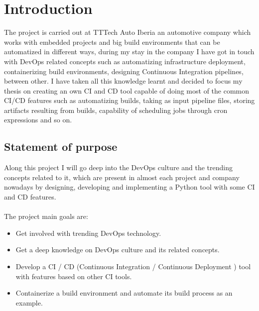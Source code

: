 \documentclass{article}
\begin{document}
\tableofcontents
\newpage

\listoffigures

\newpage
{}
\listoftables

\newpage
\section{Introduction}

The project is carried out at TTTech Auto Iberia an automotive company which works with embedded projects and big build environments that can be automatized in different ways, during my stay in the company I have got in touch with DevOps related concepts such as automatizing infrastructure deployment, containerizing build environments, designing Continuous Integration pipelines, between other. I have taken all this knowledge learnt and decided to focus my thesis on creating an own \gls{CI} and \gls{CD} tool capable of doing most of the common \gls{CI}/\gls{CD} features such as automatizing builds, taking as input pipeline files, storing artifacts resulting from builds, capability of scheduling jobs through cron expressions and so on.

\subsection{Statement of purpose}

Along this project I will go deep into the DevOps culture and the trending concepts related to it, which are present in almost each project and company nowadays by designing, developing and implementing a Python tool with some \gls{CI} and \gls{CD} features.
\\~\\
The project main goals are:
\begin{itemize}
	\item Get involved with trending DevOps technology.
	\item Get a deep knowledge on DevOps culture and its related concepts.
	\item Develop a \gls{CI} / \gls{CD} (Continuous Integration / Continuous Deployment ) tool with features based on other \gls{CI} tools.
	\item Containerize a build environment and automate its build process as an example.
\end{itemize}
\end{document}
